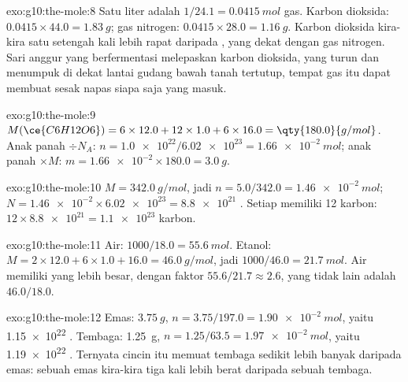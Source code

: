 \begin{solution}{exo:g10:the-mole:8}
Satu liter adalah $1/24.1 = \qty{0.0415}{mol}$ gas. Karbon dioksida:
$0.0415 \times 44.0 = \qty{1.83}{g}$; gas nitrogen:
$0.0415 \times 28.0 = \qty{1.16}{g}$. Karbon dioksida kira-kira satu
setengah kali lebih rapat daripada , yang  dekat
dengan  gas nitrogen. Sari anggur yang berfermentasi
melepaskan karbon dioksida, yang turun dan menumpuk di dekat lantai
gudang bawah tanah tertutup, tempat gas itu dapat membuat sesak napas
siapa saja yang masuk.
\end{solution}

\begin{solution}{exo:g10:the-mole:9}
$M(\ce{C6H12O6}) = 6 \times 12.0 + 12 \times 1.0 + 6 \times 16.0 =
\qty{180.0}{g/mol}$. Anak panah $\div N_A$: $n = \num{1.0e22} / \num{6.02e23} =
\qty{1.66e-2}{mol}$; anak panah $\times M$: $m = \num{1.66e-2} \times 180.0 =
\qty{3.0}{g}$.
\end{solution}

\begin{solution}{exo:g10:the-mole:10}
$M = \qty{342.0}{g/mol}$, jadi $n = 5.0 / 342.0 = \qty{1.46e-2}{mol}$;
$N = \num{1.46e-2} \times \num{6.02e23} = \num{8.8e21}$ . Setiap
 memiliki 12  karbon: $12 \times \num{8.8e21} = \num{1.1e23}$
 karbon.
\end{solution}

\begin{solution}{exo:g10:the-mole:11}
Air: $1000 / 18.0 = \qty{55.6}{mol}$. Etanol:
$M = 2 \times 12.0 + 6 \times 1.0 + 16.0 = \qty{46.0}{g/mol}$, jadi
$1000 / 46.0 = \qty{21.7}{mol}$. Air memiliki  yang lebih
besar, dengan faktor $55.6 / 21.7 \approx 2.6$, yang tidak lain adalah
$46.0 / 18.0$.
\end{solution}

\begin{solution}{exo:g10:the-mole:12}
Emas: $\qty{3.75}{g}$, $n = 3.75 / 197.0 = \qty{1.90e-2}{mol}$, yaitu
\num{1.15e22} . Tembaga: \qty{1.25}{g},
$n = 1.25 / 63.5 = \qty{1.97e-2}{mol}$, yaitu \num{1.19e22} .
Ternyata cincin itu memuat  tembaga sedikit lebih banyak daripada
 emas: sebuah  emas kira-kira tiga kali lebih berat daripada
sebuah  tembaga.
\end{solution}

